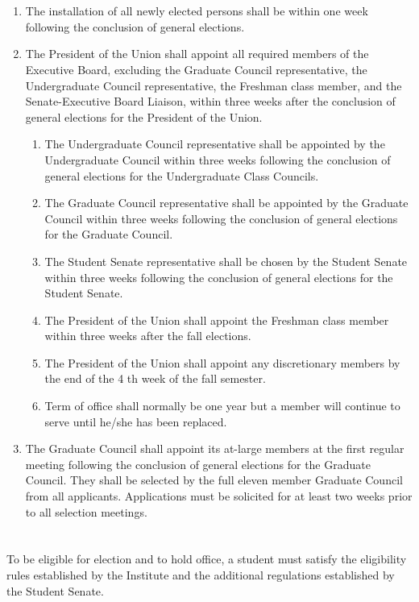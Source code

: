 \section{}
\begin{enumerate}
\item The installation of all newly elected persons shall be within one week following the conclusion of
general elections.
\item The President of the Union shall appoint all required members of the Executive Board, excluding
the Graduate Council representative, the Undergraduate Council representative, the Freshman
class member, and the Senate-Executive Board Liaison, within three weeks after the conclusion
of general elections for the President of the Union.
\begin{enumerate}
\item The Undergraduate Council representative shall be appointed by the Undergraduate
Council within three weeks following the conclusion of general elections for the
Undergraduate Class Councils.
\item The Graduate Council representative shall be appointed by the Graduate Council within
three weeks following the conclusion of general elections for the Graduate Council.
\item The Student Senate representative shall be chosen by the Student Senate within three
weeks following the conclusion of general elections for the Student Senate.
\item The President of the Union shall appoint the Freshman class member within three
weeks after the fall elections.
\item The President of the Union shall appoint any discretionary members by the end of the
4
th week of the fall semester.
\item Term of office shall normally be one year but a member will continue to serve until
he/she has been replaced.
\end{enumerate}
\item The Graduate Council shall appoint its at-large members at the first regular meeting following
the conclusion of general elections for the Graduate Council. They shall be selected by the full
eleven member Graduate Council from all applicants. Applications must be solicited for at least
two weeks prior to all selection meetings.
\end{enumerate}

\section{}
To be eligible for election and to hold office, a student must satisfy the eligibility rules established by the
Institute and the additional regulations established by the Student Senate.